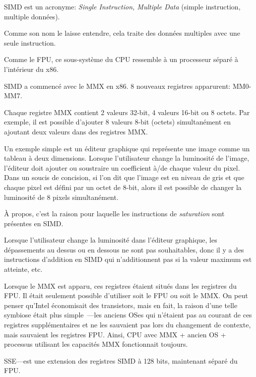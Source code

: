 
\label{SIMD_x86}
\ac{SIMD} est un acronyme: \emph{Single Instruction, Multiple Data} (simple instruction,
multiple données).

Comme son nom le laisse entendre, cela traite des données multiples avec une seule
instruction.

Comme le \ac{FPU}, ce sous-système du \ac{CPU} ressemble à un processeur séparé à
l'intérieur du x86.


SIMD a commencé avec le MMX en x86. 8 nouveaux registres apparurent: MM0-MM7.

Chaque registre MMX contient 2 valeurs 32-bit, 4 valeurs 16-bit ou 8 octets.
Par exemple, il est possible d'ajouter 8 valeurs 8-bit (octets) simultanément en
ajoutant deux valeurs dans des registres MMX.

Un exemple simple est un éditeur graphique qui représente une image comme un tableau
à deux dimensions.
Lorsque l'utilisateur change la luminosité de l'image, l'éditeur doit ajouter ou
soustraire un coefficient à/de chaque valeur du pixel.
Dans un soucis de concision, si l'on dit que l'image est en niveau de gris et que
chaque pixel est défini par un octet de 8-bit, alors il est possible de changer la
luminosité de 8 pixels simultanément.

À propos, c'est la raison pour laquelle les instructions de \emph{saturation} sont
présentes en SIMD.

Lorsque l'utilisateur change la luminosité dans l'éditeur graphique, les dépassements
au dessus ou en dessous ne sont pas souhaitables, donc il y a des instructions d'addition
en SIMD qui n'additionnent pas si la valeur maximum est atteinte, etc.

Lorsque le MMX est apparu, ces registres étaient situés dans les registres du FPU.
Il était seulement possible d'utiliser soit le FPU ou soit le MMX. On peut penser
qu'Intel économisait des transistors, mais en fait, la raison d'une telle symbiose
était plus simple~---les anciens \ac{OS}es qui n'étaient pas au courant de ces registres
supplémentaires et ne les sauvaient pas lors du changement de contexte, mais sauvaient
les registres FPU.
Ainsi, CPU avec MMX + ancien \ac{OS} + processus utilisant les capacités MMX fonctionnait
toujours.

SSE---est une extension des registres SIMD à 128 bits, maintenant séparé du FPU.


